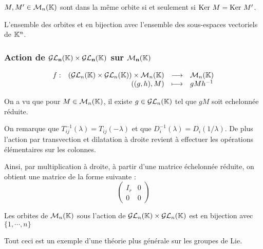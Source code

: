 \begin{coro}
 
$M,M' \in \mathcal{M}_n(\mathbb{K})$ sont dans la même orbite si et seulement si $\operatorname{Ker\,} M = \operatorname{Ker\,}
M'$.
\end{coro}

\begin{coro}
 
L'ensemble des orbites et en bijection avec l'ensemble des sous-espaces
vectoriels de $\mathbb{K}^n$.
\end{coro}


\vspace{0.5em}
\subsubsection{Action de $\mathbf{\mathcal{GL}_n(\mathbb{K})\times\mathcal{GL}_n(\mathbb{K})}$ sur
$\mathbf{\mathcal{M}_n(\mathbb{K})}$}
\vspace{0.5em}

\begin{displaymath}  \begin{array}{rrcl}
     f :&   (\mathcal{GL}_n(\mathbb{K})\times\mathcal{GL}_n(\mathbb{K}))\times\mathcal{M}_n(\mathbb{K})&\longrightarrow&\mathcal{M}_n(\mathbb{K}) \\
        &((g,h),M) &\longmapsto&gMh^{-1} \\
       \end{array}\end{displaymath}

On a vu que pour $M\in \mathcal{M}_n(\mathbb{K})$, il existe $g\in \mathcal{GL}_n(\mathbb{K})$ tel que $gM$ soit
echelonnée réduite.

On remarque que $T_{ij}^{-1}(\lambda) = T_{ij}(-\lambda)$ et que
$D_i^{-1}(\lambda) = D_i(1/\lambda)$. De plus l'action par transvection et
dilatation à droite revient à effectuer les opérations élémentaires sur les
colonnes.

Ainsi, par multiplication à droite, à partir d'une matrice échelonnée réduite,
on obtient une matrice de la forme suivante :
\begin{displaymath}\begin{pmatrix} I_r & 0 \\ 0 & 0
\end{pmatrix}\end{displaymath}

\begin{theo}

Les orbites de $\mathcal{M}_n(\mathbb{K})$ sous l'action de $\mathcal{GL}_n(\mathbb{K})\times\mathcal{GL}_n(\mathbb{K})$ est en
bijection avec $\{1,\cdots,n\}$
\end{theo}

\begin{example}[Remarque]
 Tout ceci est un exemple d'une théorie plus générale sur les groupes de Lie.
\end{example}


